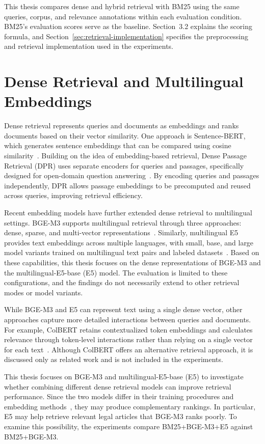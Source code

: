This thesis compares dense and hybrid retrieval with BM25 using the same queries, corpus, and relevance annotations within each evaluation condition. BM25's evaluation scores serve as the baseline. Section~3.2 explains the scoring formula, and Section~\ref{sec:retrieval-implementation} specifies the preprocessing and retrieval implementation used in the experiments.

\section{Dense Retrieval and Multilingual Embeddings}

Dense retrieval represents queries and documents as embeddings and ranks documents based on their vector similarity. One approach is Sentence-BERT, which generates sentence embeddings that can be compared using cosine similarity~\cite{reimers2019}. Building on the idea of embedding-based retrieval, Dense Passage Retrieval (DPR) uses separate encoders for queries and passages, specifically designed for open-domain question answering~\cite{karpukhin2020}. By encoding queries and passages independently, DPR allows passage embeddings to be precomputed and reused across queries, improving retrieval efficiency.

Recent embedding models have further extended dense retrieval to multilingual settings. BGE-M3 supports multilingual retrieval through three approaches: dense, sparse, and multi-vector representations~\cite{chen2024}. Similarly, multilingual E5 provides text embeddings across multiple languages, with small, base, and large model variants trained on multilingual text pairs and labeled datasets~\cite{wang2024}. Based on these capabilities, this thesis focuses on the dense representations of BGE-M3 and the multilingual-E5-base (E5) model. The evaluation is limited to these configurations, and the findings do not necessarily extend to other retrieval modes or model variants.

While BGE-M3 and E5 can represent text using a single dense vector, other approaches capture more detailed interactions between queries and documents. For example, ColBERT retains contextualized token embeddings and calculates relevance through token-level interactions rather than relying on a single vector for each text~\cite{khattab2020}. Although ColBERT offers an alternative retrieval approach, it is discussed only as related work and is not included in the experiments.

This thesis focuses on BGE-M3 and multilingual-E5-base (E5) to investigate whether combining different dense retrieval models can improve retrieval performance. Since the two models differ in their training procedures and embedding methods~\cite{chen2024,wang2024}, they may produce complementary rankings. In particular, E5 may help retrieve relevant legal articles that BGE-M3 ranks poorly. To examine this possibility, the experiments compare BM25+BGE-M3+E5 against BM25+BGE-M3.

